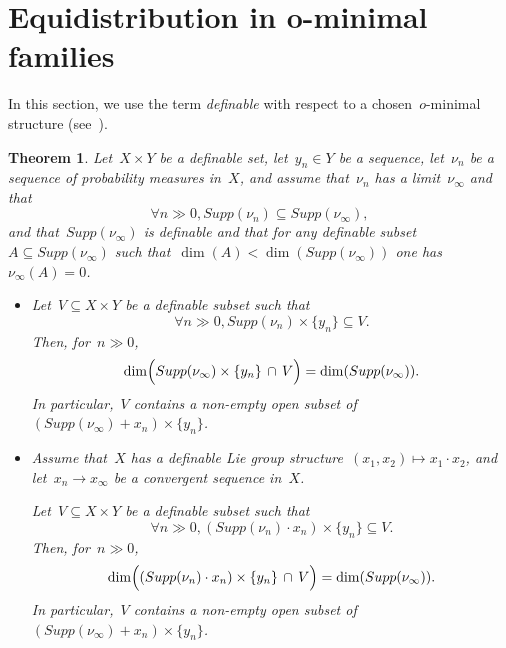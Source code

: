 \documentclass[12pt]{amsart}
\newtheorem{theorem}{Theorem}[section]
\begin{document}
\section{Equidistribution in o-minimal families}
In this section, we use the term \emph{definable} with respect to a chosen~$o$-minimal structure (see~\cite{VdD}).
\begin{theorem}\label{thm:equi0}
Let~$X\times Y$ be a definable set, let~$y_n\in Y$ be a sequence, let~$\nu_n$ be a sequence of probability measures in~$X$, and assume that~$\nu_n$ has a limit~$\nu_\infty$ and that
\begin{equation}\label{eq:equi1}
\forall n\gg0, Supp(\nu_n)\subseteq Supp(\nu_\infty),
\end{equation}
and that~$Supp(\nu_\infty)$ is definable and that for any definable subset~$A\subseteq Supp(\nu_\infty)$ such that~$\dim(A)<\dim(Supp(\nu_\infty))$ one has~$\nu_\infty(A)=0$. 

\begin{itemize}
\item
Let~$V\subseteq X\times Y$ be a definable subset such that
\begin{equation}\label{eq:equi2}
\forall n\gg0, Supp(\nu_n)\times\{y_n\}\subseteq V.
\end{equation}
Then, for~$n\gg0$, 
\begin{equation}\label{eq:equi3}
\dim\Bigl(Supp(\nu_\infty)\times\{y_n\}\,\cap\,V\Bigr)=\dim(Supp(\nu_\infty)).
\end{equation}In particular,~$V$ contains a non-empty open subset of~$(Supp(\nu_\infty)+x_n)\times \{y_n\}$.
\item
Assume that~$X$ has a definable Lie group structure~$(x_1,x_2)\mapsto x_1\cdot x_2$, and let~$x_n\to x_\infty$ be a convergent sequence in~$X$.

Let~$V\subseteq X\times Y$ be a definable subset such that
\begin{equation}\label{eq:equi4}
\forall n\gg0, (Supp(\nu_n)\cdot x_n)\times\{y_n\}\subseteq V.
\end{equation}
Then, for~$n\gg0$, 
\begin{equation}\label{eq:equi6}
\dim\Bigl(\left(Supp(\nu_n)\cdot x_n\right)\times\{y_n\}\,\cap\,V\Bigr)=\dim(Supp(\nu_\infty)).
\end{equation}
In particular,~$V$ contains a non-empty open subset of~$(Supp(\nu_\infty)+x_n)\times \{y_n\}$.
\end{itemize}
\end{theorem}
\end{document}
